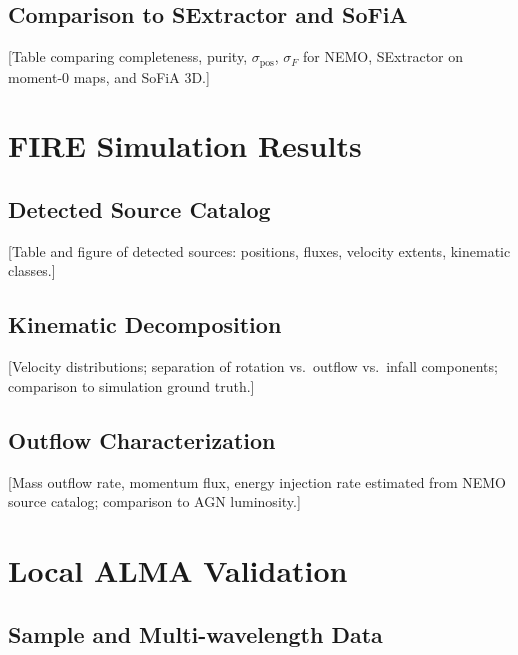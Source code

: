 \documentclass{aa}
\begin{document}
\subsection{Comparison to SExtractor and SoFiA}
\label{sec:validation_comparison}

[Table comparing completeness, purity, $\sigma_{\mathrm{pos}}$, $\sigma_F$ for NEMO, SExtractor on moment-0 maps, and SoFiA 3D.]

\section{FIRE Simulation Results}
\label{sec:fire}

\subsection{Detected Source Catalog}
\label{sec:fire_catalog}

[Table and figure of detected sources: positions, fluxes, velocity extents, kinematic classes.]

\subsection{Kinematic Decomposition}
\label{sec:fire_kinematics}

[Velocity distributions; separation of rotation vs.\ outflow vs.\ infall components; comparison to simulation ground truth.]

\subsection{Outflow Characterization}
\label{sec:fire_outflow}

[Mass outflow rate, momentum flux, energy injection rate estimated from NEMO source catalog; comparison to AGN luminosity.]

\section{Local ALMA Validation}
\label{sec:local}

\subsection{Sample and Multi-wavelength Data}
\label{sec:local_sample}
\end{document}
